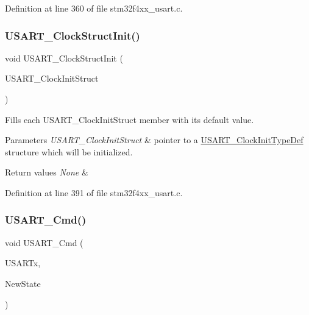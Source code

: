 Definition at line 360 of file stm32f4xx\+\_\+usart.\+c.

\mbox{\label{group___u_s_a_r_t_ga59df27d0adda18b16ee28d47672cc724}} 
\subsubsection{\texorpdfstring{U\+S\+A\+R\+T\+\_\+\+Clock\+Struct\+Init()}{USART\_ClockStructInit()}}
{\footnotesize\ttfamily void U\+S\+A\+R\+T\+\_\+\+Clock\+Struct\+Init (\begin{DoxyParamCaption}\item[{\hyperlink{struct_u_s_a_r_t___clock_init_type_def}{U\+S\+A\+R\+T\+\_\+\+Clock\+Init\+Type\+Def} $\ast$}]{U\+S\+A\+R\+T\+\_\+\+Clock\+Init\+Struct }\end{DoxyParamCaption})}



Fills each U\+S\+A\+R\+T\+\_\+\+Clock\+Init\+Struct member with its default value. 


\begin{DoxyParams}{Parameters}
{\em U\+S\+A\+R\+T\+\_\+\+Clock\+Init\+Struct} & pointer to a \hyperlink{struct_u_s_a_r_t___clock_init_type_def}{U\+S\+A\+R\+T\+\_\+\+Clock\+Init\+Type\+Def} structure which will be initialized. \\
\hline
\end{DoxyParams}

\begin{DoxyRetVals}{Return values}
{\em None} & \\
\hline
\end{DoxyRetVals}


Definition at line 391 of file stm32f4xx\+\_\+usart.\+c.

\mbox{\label{group___u_s_a_r_t_ga45e51626739c5f22a6567c8a85d1d85e}} 
\subsubsection{\texorpdfstring{U\+S\+A\+R\+T\+\_\+\+Cmd()}{USART\_Cmd()}}
{\footnotesize\ttfamily void U\+S\+A\+R\+T\+\_\+\+Cmd (\begin{DoxyParamCaption}\item[{\hyperlink{struct_u_s_a_r_t___type_def}{U\+S\+A\+R\+T\+\_\+\+Type\+Def} $\ast$}]{U\+S\+A\+R\+Tx,  }\item[{Functional\+State}]{New\+State }\end{DoxyParamCaption})}



